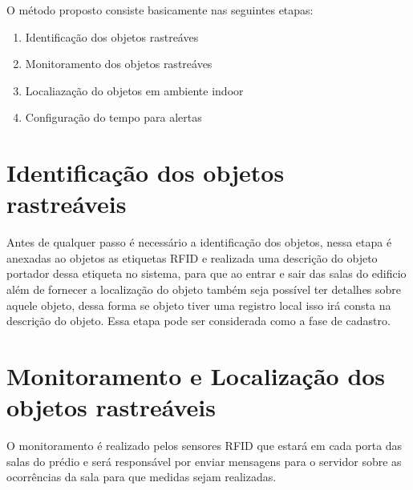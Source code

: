 \par
O método proposto consiste basicamente nas seguintes etapas:
\begin{enumerate}
    \item Identificação dos objetos rastreáves
    \item Monitoramento dos objetos rastreáves
    \item Localiazação do objetos em ambiente indoor
    \item Configuração do tempo para alertas
\end{enumerate}
\section{Identificação dos objetos rastreáveis}
Antes de qualquer passo é necessário a identificação dos objetos, nessa etapa é anexadas ao objetos as etiquetas RFID e realizada uma descrição do objeto portador dessa etiqueta no sistema, para que ao entrar e sair das salas do edificio além de fornecer a localização do objeto também seja possível ter detalhes sobre aquele objeto, dessa forma se objeto tiver uma registro local isso irá consta na descrição do objeto. Essa etapa pode ser considerada como a fase de cadastro.

\section{Monitoramento e Localização dos objetos rastreáveis}
O monitoramento é realizado pelos sensores RFID que estará em cada porta das salas do prédio e será responsável por enviar mensagens para o servidor sobre as ocorrências da sala para que medidas sejam realizadas.
